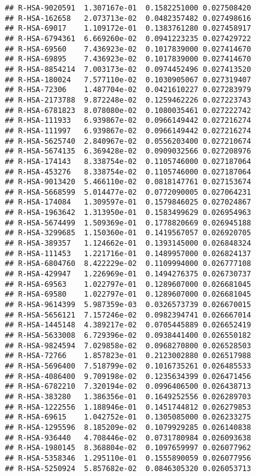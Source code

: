 \documentclass[
]{article}
\begin{document}
\begin{verbatim}
## R-HSA-9020591  1.307167e-01  0.1582251000 0.027508420
## R-HSA-162658   2.073713e-02  0.0482357482 0.027498616
## R-HSA-69017    1.109172e-01  0.1383761280 0.027458917
## R-HSA-6794361  6.669260e-02  0.0941223235 0.027429722
## R-HSA-69560    7.436923e-02  0.1017839000 0.027414670
## R-HSA-69895    7.436923e-02  0.1017839000 0.027414670
## R-HSA-8854214  7.003173e-02  0.0974452496 0.027413520
## R-HSA-180024   7.577110e-02  0.1030905067 0.027319407
## R-HSA-72306    1.487704e-02  0.0421610227 0.027283979
## R-HSA-2173788  9.872248e-02  0.1259462226 0.027223743
## R-HSA-6781823  8.078080e-02  0.1080035461 0.027222742
## R-HSA-111933   6.939867e-02  0.0966149442 0.027216274
## R-HSA-111997   6.939867e-02  0.0966149442 0.027216274
## R-HSA-5625740  2.840967e-02  0.0556203400 0.027210674
## R-HSA-5674135  6.369428e-02  0.0909032566 0.027208976
## R-HSA-174143   8.338754e-02  0.1105746000 0.027187064
## R-HSA-453276   8.338754e-02  0.1105746000 0.027187064
## R-HSA-9013420  5.466110e-02  0.0818147761 0.027153674
## R-HSA-5668599  5.014477e-02  0.0772090005 0.027064231
## R-HSA-174084   1.309597e-01  0.1579846025 0.027024867
## R-HSA-1963642  1.313950e-01  0.1583499629 0.026954963
## R-HSA-5674499  1.509369e-01  0.1778820669 0.026945188
## R-HSA-3299685  1.150360e-01  0.1419567057 0.026920705
## R-HSA-389357   1.124662e-01  0.1393145000 0.026848324
## R-HSA-111453   1.221716e-01  0.1489957000 0.026824137
## R-HSA-6804760  8.422229e-02  0.1109994000 0.026777108
## R-HSA-429947   1.226969e-01  0.1494276375 0.026730737
## R-HSA-69563    1.022797e-01  0.1289607000 0.026681045
## R-HSA-69580    1.022797e-01  0.1289607000 0.026681045
## R-HSA-9614399  5.987359e-03  0.0326573739 0.026670015
## R-HSA-5656121  7.157246e-02  0.0982394741 0.026667014
## R-HSA-1445148  4.389217e-02  0.0705445889 0.026652419
## R-HSA-5633008  6.729396e-02  0.0938441400 0.026550182
## R-HSA-9824594  7.029858e-02  0.0968270800 0.026528503
## R-HSA-72766    1.857823e-01  0.2123002880 0.026517988
## R-HSA-5696400  7.518799e-02  0.1016735261 0.026485533
## R-HSA-4086400  9.709198e-02  0.1235634399 0.026471456
## R-HSA-6782210  7.320194e-02  0.0996406500 0.026438713
## R-HSA-383280   1.386356e-01  0.1649252556 0.026289703
## R-HSA-1222556  1.188946e-01  0.1451744812 0.026279853
## R-HSA-69615    1.042752e-01  0.1305085000 0.026233275
## R-HSA-1295596  8.185209e-02  0.1079929285 0.026140838
## R-HSA-936440   4.708446e-02  0.0731780984 0.026093638
## R-HSA-1980145  8.368804e-02  0.1097659997 0.026077962
## R-HSA-5358346  1.295110e-01  0.1555890059 0.026077956
## R-HSA-5250924  5.857682e-02  0.0846305320 0.026053713

\end{verbatim}
\end{document}
